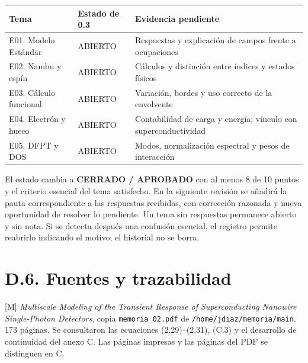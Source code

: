 \documentclass[
  spanish,
  10pt,
  a4paper,
]{article}
\newcounter{none} %
\begin{document}
{\def\LTcaptype{none} %
\begin{longtable}[]{@{}
  >{\raggedright\arraybackslash}p{}
  >{\raggedright\arraybackslash}p{}
  >{\raggedright\arraybackslash}p{}@{}}
\toprule\noalign{}
\begin{minipage}[b]{\linewidth}\raggedright
Tema
\end{minipage} & \begin{minipage}[b]{\linewidth}\raggedright
Estado de 0.3
\end{minipage} & \begin{minipage}[b]{\linewidth}\raggedright
Evidencia pendiente
\end{minipage} \\
\midrule\noalign{}
\endhead
\bottomrule\noalign{}
\endlastfoot
E01. Modelo Estándar & ABIERTO & Respuestas y explicación de campos
frente a ocupaciones \\
E02. Nambu y espín & ABIERTO & Cálculos y distinción entre índices y
estados físicos \\
E03. Cálculo funcional & ABIERTO & Variación, bordes y uso correcto de
la envolvente \\
E04. Electrón y hueco & ABIERTO & Contabilidad de carga y energía;
vínculo con superconductividad \\
E05. DFPT y DOS & ABIERTO & Modos, normalización espectral y pesos de
interacción \\
\end{longtable}
}

El estado cambia a \textbf{CERRADO / APROBADO} con al menos 8 de 10
puntos y el criterio esencial del tema satisfecho. En la siguiente
revisión se añadirá la pauta correspondiente a las respuestas recibidas,
con corrección razonada y nueva oportunidad de resolver lo pendiente. Un
tema sin respuestas permanece abierto y sin nota. Si se detecta después
una confusión esencial, el registro permite reabrirlo indicando el
motivo; el historial no se borra.

\section{D.6. Fuentes y trazabilidad}\label{d.6.-fuentes-y-trazabilidad}

{[}M{]} \emph{Multiscale Modeling of the Transient Response of
Superconducting Nanowire Single-Photon Detectors}, copia
\nolinkurl{memoria_02.pdf} de \nolinkurl{/home/jdiaz/memoria/main}, 173
páginas. Se consultaron las ecuaciones (2.29)--(2.31), (C.3) y el
desarrollo de continuidad del anexo C. Las páginas impresas y las
páginas del PDF se distinguen en C.
\end{document}
